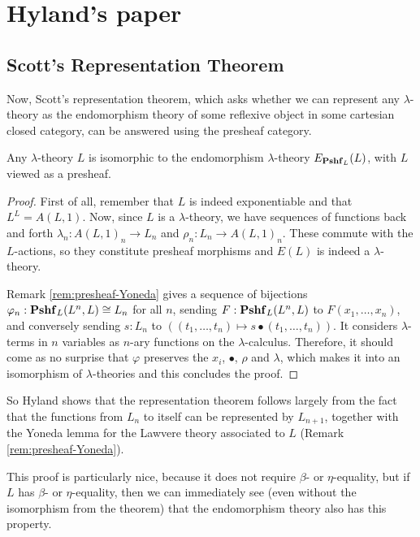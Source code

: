 \chapter{Hyland's paper}


\section{Scott's Representation Theorem}

Now, Scott's representation theorem, which asks whether we can represent any $ \lambda $-theory as the endomorphism theory of some reflexive object in some cartesian closed category, can be answered using the presheaf category.
\begin{theorem}\label{thm:representation-theorem}
  Any $ \lambda $-theory $ L $ is isomorphic to the endomorphism $ \lambda $-theory $ E_{\mathbf{Pshf}_{L}}(L) $, with $ L $ viewed as a presheaf.
\end{theorem}
\begin{proof}
  First of all, remember that $ L $ is indeed exponentiable and that $ L^L = A(L, 1) $.
  Now, since $ L $ is a $ \lambda $-theory, we have sequences of functions back and forth $ \lambda_n: A(L, 1)_n \to L_n $ and $ \rho_n: L_n \to A(L, 1)_n $. These commute with the $ L $-actions, so they constitute presheaf morphisms and $ E(L) $ is indeed a $ \lambda $-theory.

  Remark \ref{rem:presheaf-Yoneda} gives a sequence of bijections $ \varphi_n : \mathbf{Pshf}_{L}(L^n, L) \cong L_n $ for all $ n $, sending $ F: \mathbf{Pshf}_{L}(L^n, L) $ to $ F(x_1, \dots, x_n) $, and conversely sending $ s: L_n $ to $ ((t_1, \dots, t_n) \mapsto s \bullet (t_1, \dots, t_n)) $. It considers $ \lambda $-terms in $ n $ variables as $ n $-ary functions on the $ \lambda $-calculus. Therefore, it should come as no surprise that $ \varphi $ preserves the $ x_i $, $ \bullet $, $ \rho $ and $ \lambda $, which makes it into an isomorphism of $ \lambda $-theories and this concludes the proof.
\end{proof}
So Hyland shows that the representation theorem follows largely from the fact that the functions from $ L_n $ to itself can be represented by $ L_{n + 1} $, together with the Yoneda lemma for the Lawvere theory associated to $ L $ (Remark \ref{rem:presheaf-Yoneda}).

This proof is particularly nice, because it does not require $ \beta $- or $ \eta $-equality, but if $ L $ has $ \beta $- or $ \eta $-equality, then we can immediately see (even without the isomorphism from the theorem) that the endomorphism theory also has this property.

